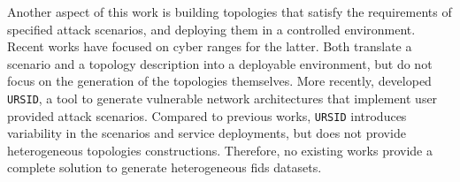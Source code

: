 Another aspect of this work is building topologies that satisfy the requirements of specified attack scenarios, and deploying them in a controlled environment.
Recent works have focused on cyber ranges\footnotemark{} for the latter.
Both \textcite{venkatesan_VulnerVANVulnerableNetwork_2019,yamin_Modelingexecutingcyber_2022} translate a scenario and a topology description into a deployable environment, but do not focus on the generation of the topologies themselves.
More recently, \textcite{besson_URSIDAutomaticallyRefining_2024a} developed \texttt{URSID}, a tool to generate vulnerable network architectures that implement user provided attack scenarios.
Compared to previous works, \texttt{URSID} introduces variability in the scenarios and service deployments, but does not provide heterogeneous topologies constructions.
Therefore, no existing works provide a complete solution to generate heterogeneous \gls{fids} datasets.

